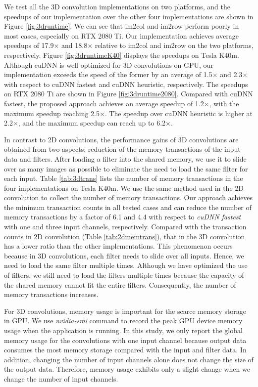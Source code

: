 We test all the 3D convolution implementations on two platforms, and the speedups of our implementation over the other four implementations are shown
in Figure \ref{fig:3druntime}. We can see that im2col and im2row perform poorly in most cases, especially on RTX 2080 Ti. Our
implementation achieves average speedups of 17.9$\times$ and 18.8$\times$ relative to im2col and im2row on the two platforms, respectively. Figure \ref{fig:3druntimeK40} displays the speedups on Tesla K40m. Although cuDNN is well optimized for 3D convolutions on GPU, our implementation exceeds the speed of the former by an average of 1.5$\times$ and 2.3$\times$ with respect to cuDNN fastest and cuDNN heuristic, respectively. The speedups on RTX 2080 Ti are shown in Figure \ref{fig:3druntime2080}. Compared with cuDNN fastest, the proposed approach achieves an average speedup of 1.2$\times$, with the maximum speedup reaching 2.5$\times$. The speedup over cuDNN heuristic is higher at 2.2$\times$, and the maximum speedup can reach up to 6.2$\times$.

In contrast to 2D convolutions, the performance gains of 3D convolutions are obtained from two aspects: reduction of the memory transactions of the input data and filters. After loading a filter into the shared memory, we use it to slide over as many images as possible to eliminate the need to load the same filter for each input. Table \ref{tab:3dtrans} lists the number of memory transactions in the four implementations on Tesla K40m. We use the same method used in the 2D convolution to collect the number of memory transactions. Our approach achieves
the minimum transaction counts in all tested cases and can reduce the number of memory transactions by a factor of 6.1 and 4.4
with respect to \emph{cuDNN fastest} with one and three input channels, respectively. Compared with the transaction counts in 2D convolution (Table \ref{tab:2dmemtrans}), that in the 3D convolution has a lower ratio than the other implementations. This phenomenon occurs because in 3D convolutions, each filter needs to slide over all inputs. Hence, we need to load the same filter multiple times. Although we have optimized the use of filters, we still need to load the filters multiple times because the capacity of the shared memory cannot fit the entire
filters. Consequently, the number of memory transactions increases.

For 3D convolutions, memory usage is important for the scarce memory storage in GPU. We use \emph{nvidia-smi} command to record the peak GPU device memory usage when the application is running. In this study, we only report the global memory usage for the
convolutions with one input channel because output data consumes the most memory storage compared with the input and filter data. In addition, changing the number of input channels alone does not change the size of the output data. Therefore, memory usage exhibits only a slight change when we change the number of input channels.

